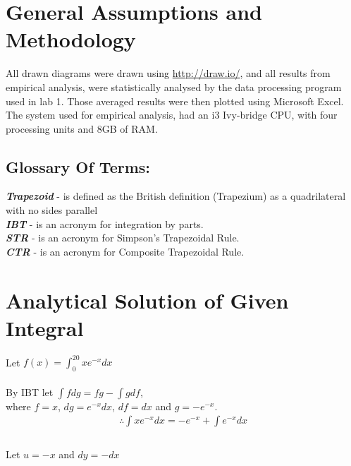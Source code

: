 \documentclass[11pt]{article}
\begin{document}
\begin{page}
\clearpage
\setcounter{page}{1}

\section{General Assumptions and Methodology}
All drawn diagrams were drawn using \url{http://draw.io/}, and all results from empirical analysis, were statistically analysed by the data processing program used in lab 1. Those averaged results were then plotted using Microsoft Excel.\\

\noindent The system used for empirical analysis, had an i3 Ivy-bridge CPU, with four processing units and 8GB of RAM.\\

\subsection{Glossary Of Terms:}
\noindent \textbf{\textit{Trapezoid}} - is defined as the British definition (Trapezium) as a quadrilateral with no sides parallel \\
\noindent \textbf{\textit{IBT}} - is an acronym for integration by parts.\\
\noindent \textbf{\textit{STR}} - is an acronym for Simpson's Trapezoidal Rule.\\
\noindent \textbf{\textit{CTR}} - is an acronym for Composite Trapezoidal Rule.\\

\section{Analytical Solution of Given Integral}
\noindent Let $f(x) = \int_{0}^{20} xe^{-x} dx$\\
\\
\noindent By IBT let $\int fdg = fg - \int gdf$, \\
where $f = x$, $dg = e^{-x} dx$, $df = dx$ and $g = -e^{-x}$.\\

\begin{equation} 
\begin{aligned}
    \therefore{} \int xe^{-x} dx = -e^{-x} + \int e^{-x} dx\\ 
\end{aligned}
\end{equation}
\\
\noindent Let $u = -x$ and $dy = -dx$


\end{page}
\end{document}
